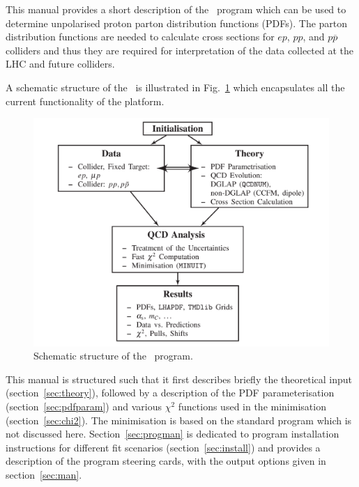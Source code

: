 \label{section:introduction}
This manual provides a short description of the \fitter\ program 
which can be used to determine unpolarised proton parton distribution functions 
(PDFs). 
The parton distribution functions are needed to calculate cross sections
for $ep$, $pp$, and $p\overline{p}$ colliders and thus they are required for interpretation
of the data collected at the LHC and future colliders.

A schematic structure of the \fitter\ is illustrated in Fig.~\ref{fig:flow} which encapsulates all the current functionality of the platform.
\begin{figure}[!ht]
\begin{center}
\includegraphics[width=0.75\linewidth]{figures/flow.pdf}
\caption{Schematic structure of the \fitter\ program.}
\end{center}
\label{fig:flow}
\end{figure}

This manual is structured such that it first describes briefly the
 theoretical input (section~\ref{sec:theory}), followed by a description of the
PDF parameterisation (section~\ref{sec:pdfparam}) and various $\chi^2$ functions used in the minimisation (section~\ref{sec:chi2}). The minimisation is based on the standard \minuit program \cite{MINUIT} which is not discussed here.
Section~\ref{sec:progman} is dedicated to program installation instructions for different fit scenarios (section~\ref{sec:install}) and provides a description of the program steering cards, with the output options given in section~\ref{sec:man}.
